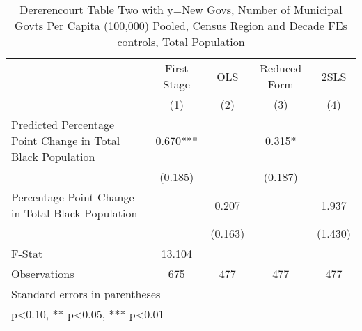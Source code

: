 \begin{table}[htbp]\centering
\def\sym#1{\ifmmode^{#1}\else\(^{#1}\)\fi}
\caption{Dererencourt Table Two with y=New Govs, Number of Municipal Govts Per Capita (100,000) Pooled, Census Region and Decade FEs controls, Total Population}
\begin{tabular}{l*{4}{c}}
\toprule
                    & First Stage   &         OLS   &Reduced Form   &        2SLS   \\
                    &\multicolumn{1}{c}{(1)}   &\multicolumn{1}{c}{(2)}   &\multicolumn{1}{c}{(3)}   &\multicolumn{1}{c}{(4)}   \\
\midrule
Predicted Percentage Point Change in Total Black Population&       0.670***&               &       0.315*  &               \\
                    &     (0.185)   &               &     (0.187)   &               \\
\addlinespace
Percentage Point Change in Total Black Population&               &       0.207   &               &       1.937   \\
                    &               &     (0.163)   &               &     (1.430)   \\
\midrule
F-Stat              &      13.104   &               &               &               \\
Observations        &         675   &         477   &         477   &         477   \\
\bottomrule
\multicolumn{5}{l}{\footnotesize Standard errors in parentheses}\\
\multicolumn{5}{l}{\footnotesize * p<0.10, ** p<0.05, *** p<0.01}\\
\end{tabular}
\end{table}
